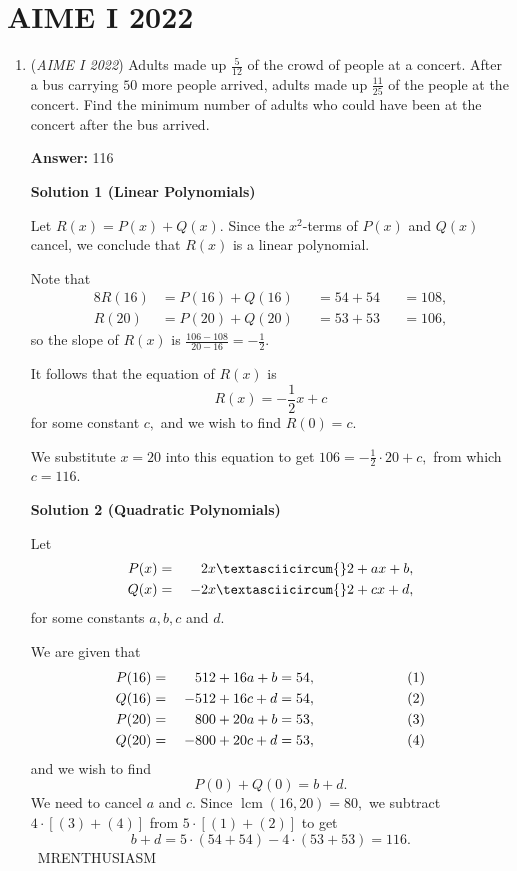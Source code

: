 \section{AIME I 2022}
        \begin{enumerate}
        	\item (\textit{AIME I 2022}) Adults made up $\frac5{12}$ of the crowd of people at a concert. After a bus carrying $50$ more people arrived, adults made up $\frac{11}{25}$ of the people at the concert. Find the minimum number of adults who could have been at the concert after the bus arrived.


 
 \textbf{Answer: }116



\textbf{Solution 1 (Linear Polynomials)}

Let $R(x)=P(x)+Q(x).$ Since the $x^2$-terms of $P(x)$ and $Q(x)$ cancel, we conclude that $R(x)$ is a linear polynomial.

 Note that
 \begin{alignat*}{8} R(16) &= P(16)+Q(16) &&= 54+54 &&= 108, \\ R(20) &= P(20)+Q(20) &&= 53+53 &&= 106, \end{alignat*}so the slope of $R(x)$ is $\frac{106-108}{20-16}=-\frac12.$

 It follows that the equation of $R(x)$ is 
 \[R(x)=-\frac12x+c\] for some constant $c,$ and we wish to find $R(0)=c.$

 We substitute $x=20$ into this equation to get $106=-\frac12\cdot20+c,$ from which $c=\boxed{116}.$




\textbf{Solution 2 (Quadratic Polynomials)}

Let
 \begin{alignat*}{8} P(x) &= &2x\textasciicircum{}2 + ax + b, \\ Q(x) &= &\hspace{1mm}-2x\textasciicircum{}2 + cx + d, \end{alignat*}for some constants $a,b,c$ and $d.$ 

 We are given that
 \begin{alignat*}{8} P(16) &= &512 + 16a + b &= 54, \hspace{20mm}&&(1) \\ Q(16) &= &\hspace{1mm}-512 + 16c + d &= 54, &&(2) \\ P(20) &= &800 + 20a + b &= 53,  &&(3) \\ Q(20) &= &\hspace{1mm}-800 + 20c + d &= 53, &&(4) \end{alignat*}and we wish to find 
 \[P(0)+Q(0)=b+d.\]We need to cancel $a$ and $c.$ Since $\operatorname{lcm}(16,20)=80,$ we subtract $4\cdot[(3)+(4)]$ from $5\cdot[(1)+(2)]$ to get 
 \[b+d=5\cdot(54+54)-4\cdot(53+53)=\boxed{116}.\]~MRENTHUSIASM


\end{enumerate}

